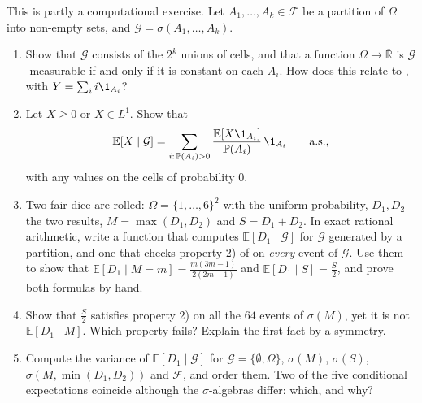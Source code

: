 \begin{exercise}\label{ex:ce-partition}
\medium This is partly a computational exercise. Let $A_1,\dots,A_k\in\mathcal F$ be a
partition of $\Omega$ into non-empty sets, and $\mathcal G=\sigma(A_1,\dots,A_k)$.
\begin{enumerate}[label=(\alph*)]
  \item Show that $\mathcal G$ consists of the $2^k$ unions of cells, and that a function
    $\Omega\to\overline{\mathbb R}$ is $\mathcal G$-measurable if and only if it is constant on
    each $A_i$. How does this relate to , with
    $Y=\sum_ii\1_{A_i}$?
  \item Let $X\ge0$ or $X\in L^1$. Show that
    \[
      \mathbb E[X\mid\mathcal G]=\sum_{i:\,\mathbb P(A_i)>0}\frac{\mathbb E[X\1_{A_i}]}{\mathbb P(A_i)}\,\1_{A_i}
      \qquad\text{a.s.},
    \]
    with any values on the cells of probability $0$.
  \item Two fair dice are rolled: $\Omega=\{1,\dots,6\}^2$ with the uniform probability, $D_1,D_2$
    the two results, $M=\max(D_1,D_2)$ and $S=D_1+D_2$. In exact rational arithmetic, write a
    function that computes $\mathbb E[D_1\mid\mathcal G]$ for $\mathcal G$ generated by a
    partition, and one that checks property 2) of  on
    \emph{every} event of $\mathcal G$. Use them to show that
    $\mathbb E[D_1\mid M=m]=\frac{m(3m-1)}{2(2m-1)}$ and $\mathbb E[D_1\mid S]=\frac S2$, and prove
    both formulas by hand.
  \item Show that $\frac S2$ satisfies property 2) on all the $64$ events of $\sigma(M)$, yet it is
    not $\mathbb E[D_1\mid M]$. Which property fails? Explain the first fact by a symmetry.
  \item Compute the variance of $\mathbb E[D_1\mid\mathcal G]$ for $\mathcal G=\{\emptyset,\Omega\}$,
    $\sigma(M)$, $\sigma(S)$, $\sigma(M,\min(D_1,D_2))$ and $\mathcal F$, and order them. Two of
    the five conditional expectations coincide although the $\sigma$-algebras differ: which, and
    why?
\end{enumerate}
\end{exercise}

